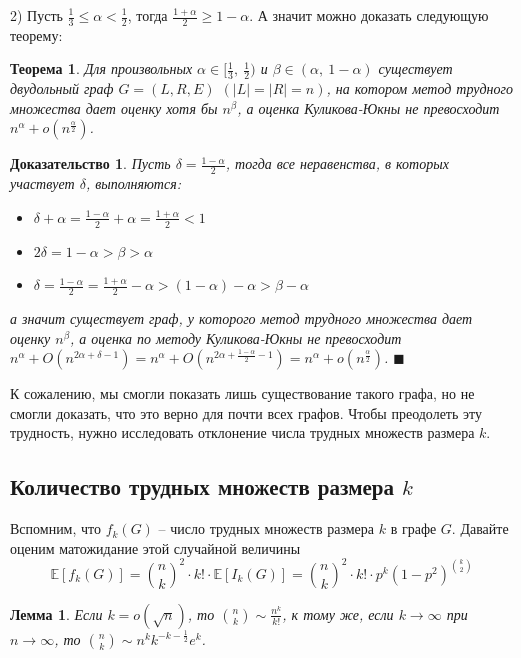 \documentclass[a4paper]{article}
\newtheorem{mtheorem}{Теорема}[section]
\newtheorem*{msolution}{Доказательство}
\newtheorem{mlemma}{Лемма}[section]
\begin{document}
2) Пусть $\frac{1}{3} \leq \alpha < \frac{1}{2}$, тогда $\frac{1+\alpha}{2} \geq 1 - \alpha$. А значит 
можно доказать следующую теорему:
\begin{mtheorem}
	Для произвольных $\alpha \in [\frac{1}{3},\ \frac{1}{2})$ и $\beta \in (\alpha,\ 1-\alpha)$ существует 
	двудольный граф $G = (L, R, E)$ $(|L| = |R| = n)$, на котором метод трудного множества 
	дает оценку хотя бы $n^\beta$, а оценка Куликова-Юкны не превосходит $n^\alpha + o(n^{\frac{\alpha}{2}})$.
\end{mtheorem}
\begin{msolution}
	Пусть $\delta = \frac{1- \alpha}{2}$, тогда все неравенства, в которых участвует $\delta$, выполняются:
	\begin{itemize}[noitemsep]
		\item $\delta + \alpha = \frac{1 - \alpha}{2} + \alpha = \frac{1 + \alpha}{2} < 1$
		\item $2\delta = 1 - \alpha > \beta > \alpha$
		\item $\delta = \frac{1 - \alpha}{2} = \frac{1 + \alpha}{2} - \alpha > (1-\alpha) - \alpha > \beta - \alpha$
	\end{itemize}
	а значит существует граф, у которого метод трудного множества дает оценку $n^{\beta}$, 
	а оценка по методу Куликова-Юкны не превосходит $n^\alpha + O(n^{2\alpha + \delta - 1}) = 
	n^\alpha + O(n^{2\alpha + \frac{1-\alpha}{2} - 1}) = n^{\alpha} + o(n^{\frac{\alpha}{2}})$. $\blacksquare$
\end{msolution}


К сожалению, мы смогли показать лишь существование такого графа, но не смогли доказать, что это верно 
для почти всех графов. Чтобы преодолеть эту трудность, нужно исследовать отклонение числа трудных множеств 
размера $k$.

\subsection{Количество трудных множеств размера $k$}

Вспомним, что $f_k(G)$ -- число трудных множеств размера $k$ в графе $G$. Давайте оценим 
матожидание этой случайной величины $$\mathbb{E}[f_k(G)] = \binom{n}{k}^2\cdot k!\cdot \mathbb{E}[I_k(G)] = 
\binom{n}{k}^2\cdot k!\cdot p^k(1-p^2)^{\binom{k}{2}}$$

\begin{mlemma}
    Если $k = o(\sqrt{n})$, то $\binom{n}{k} \sim \frac{n^k}{k!}$, к тому же, если $k \rightarrow \infty$ 
    при $n \rightarrow \infty$, то $\binom{n}{k} \sim n^k k^{-k-\frac{1}{2}}e^k$.
\end{mlemma}
\end{document}
